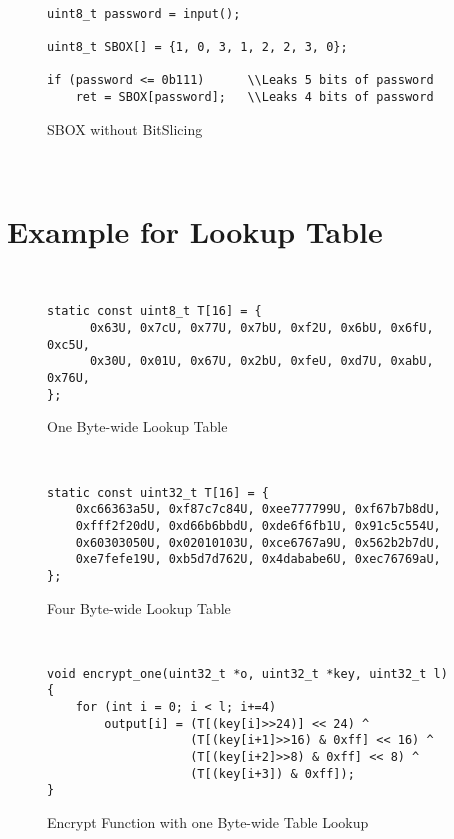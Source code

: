 ~\vvv

\begin{figure}[h!]
    \centering
    \begin{lstlisting}[xleftmargin=.02\textwidth,xrightmargin=.01\textwidth]
uint8_t password = input();

uint8_t SBOX[] = {1, 0, 3, 1, 2, 2, 3, 0};

if (password <= 0b111)      \\Leaks 5 bits of password
    ret = SBOX[password];   \\Leaks 4 bits of password
      \end{lstlisting}
    \caption{SBOX without BitSlicing}
    \label{fig:SBOX_da}
\end{figure}

~\vvv

\section{Example for Lookup Table}
~\vvv
\begin{figure}[h!]
    \centering
    \begin{lstlisting}[xleftmargin=.02\textwidth,xrightmargin=.01\textwidth]
static const uint8_t T[16] = {
      0x63U, 0x7cU, 0x77U, 0x7bU, 0xf2U, 0x6bU, 0x6fU, 0xc5U,
      0x30U, 0x01U, 0x67U, 0x2bU, 0xfeU, 0xd7U, 0xabU, 0x76U,
};
      \end{lstlisting}
    \caption{One Byte-wide Lookup Table}
    \label{fig:one_byte_table}
\end{figure}
~\vvv
\begin{figure}[h!]
    \centering
    \begin{lstlisting}[xleftmargin=.02\textwidth,xrightmargin=.01\textwidth]
static const uint32_t T[16] = {
    0xc66363a5U, 0xf87c7c84U, 0xee777799U, 0xf67b7b8dU,
    0xfff2f20dU, 0xd66b6bbdU, 0xde6f6fb1U, 0x91c5c554U,
    0x60303050U, 0x02010103U, 0xce6767a9U, 0x562b2b7dU,
    0xe7fefe19U, 0xb5d7d762U, 0x4dababe6U, 0xec76769aU,
};
    \end{lstlisting}
    \caption{Four Byte-wide Lookup Table}
    \label{fig:four_byte_table}
\end{figure}

~\vvv

\begin{figure}[h!]
    \centering
    \begin{lstlisting}[xleftmargin=.02\textwidth,xrightmargin=.01\textwidth]
void encrypt_one(uint32_t *o, uint32_t *key, uint32_t l)
{
    for (int i = 0; i < l; i+=4)
        output[i] = (T[(key[i]>>24)] << 24) ^
                    (T[(key[i+1]>>16) & 0xff] << 16) ^
                    (T[(key[i+2]>>8) & 0xff] << 8) ^
                    (T[(key[i+3]) & 0xff]);
}
    \end{lstlisting}
    \caption{Encrypt Function with one Byte-wide Table Lookup}
    \label{fig:one_byte_table_lookup}
\end{figure}

